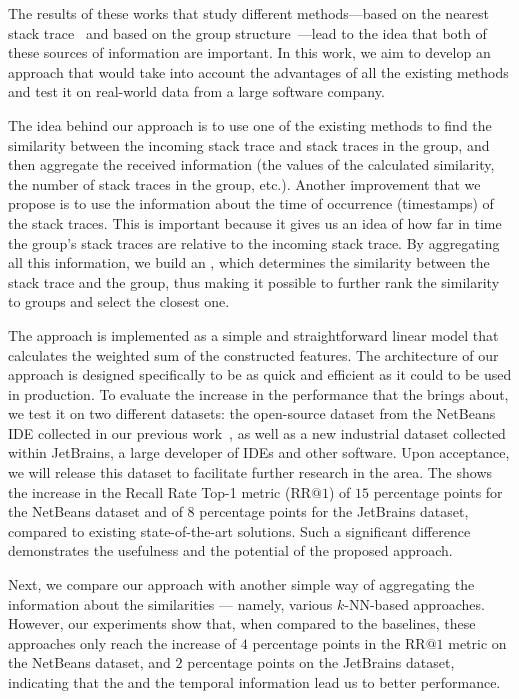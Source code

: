 The results of these works that study different methods---based on the nearest stack trace~\cite{modani,lerch,durfex,tracesim,s3m} and based on the group structure~\cite{crash_graphs}---lead to the idea that both of these sources of information are important. 
In this work, we aim to develop an approach that would take into account the advantages of all the existing methods and test it on real-world data from a large software company.

The idea behind our approach is to use one of the existing methods to find the similarity between the incoming stack trace and stack traces in the group, and then aggregate the received information (the values of the calculated similarity, the number of stack traces in the group, etc.).
Another improvement that we propose is to use the information about the time of occurrence (timestamps) of the stack traces.
This is important because it gives us an idea of how far in time the group's stack traces are relative to the incoming stack trace. 
By aggregating all this information, we build an \ag, which determines the similarity between the stack trace and the group, thus making it possible to further rank the similarity to groups and select the closest one.

The approach is implemented as a simple and straightforward linear model that calculates the weighted sum of the constructed features.
The architecture of our approach is designed specifically to be as quick and efficient as it could to be used in production.
To evaluate the increase in the performance that the \ag brings about, we test it on two different datasets: the open-source dataset from the NetBeans IDE collected in our previous work~\cite{s3m}, as well as a new industrial dataset collected within JetBrains, a large developer of IDEs and other software. 
Upon acceptance, we will release this dataset to facilitate further research in the area.
The \ag shows the increase in the Recall Rate Top-1 metric ($\mathrm{RR} @ 1$) of $15$ percentage points for the NetBeans dataset and of $8$ percentage points for the JetBrains dataset, compared to existing state-of-the-art solutions. 
Such a significant difference demonstrates the usefulness and the potential of the proposed approach.

Next, we compare our approach with another simple way of aggregating the information about the similarities --- namely, various $k$-NN-based approaches. 
However, our experiments show that, when compared to the baselines, these approaches only reach the increase of $4$ percentage points in the $\mathrm{RR} @ 1$ metric on the NetBeans dataset, and $2$ percentage points on the JetBrains dataset, indicating that the \ag and the temporal information lead us to better performance.

